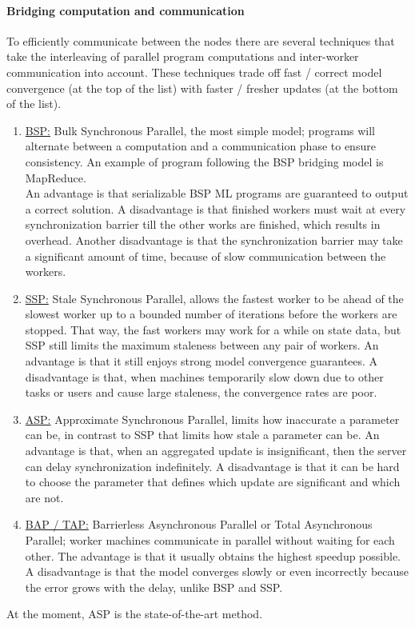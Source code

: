 \paragraph{Bridging computation and communication}
To efficiently communicate between the nodes there are several techniques that take the interleaving of parallel program computations and inter-worker communication into account. These techniques trade off fast / correct model convergence (at the top of the list) with faster / fresher updates (at the bottom of the list).
\begin{enumerate}
	\item \underline{BSP:} Bulk Synchronous Parallel, the most simple model; programs will alternate between a computation and a communication phase to ensure consistency\cite{Xing16}. An example of program following the BSP bridging model is MapReduce.\\
	An advantage is that serializable BSP ML programs are guaranteed to output a correct solution. A disadvantage is that finished workers must wait at every synchronization barrier till the other works are finished, which results in overhead\cite{Chilimbi14}. Another disadvantage is that the synchronization barrier may take a significant amount of time, because of slow communication between the workers.
	\item \underline{SSP:} Stale Synchronous Parallel, allows the fastest worker to be ahead of the slowest worker up to a bounded number of iterations before the workers are stopped. That way, the fast workers may work for a while on state data, but SSP still limits the maximum staleness between any pair of workers. An advantage is that it still enjoys strong model convergence guarantees. A disadvantage is that, when machines temporarily slow down due to other tasks or users and cause large staleness, the convergence rates are poor.
	\item \underline{ASP:} Approximate Synchronous Parallel, limits how inaccurate a parameter can be, in contrast to SSP that limits how stale a parameter can be. An advantage is that, when an aggregated update is insignificant, then the server can delay synchronization indefinitely. A disadvantage is that it can be hard to choose the parameter that defines which update are significant and which are not. \cite{Hsieh17}
	\item \underline{BAP / TAP:} Barrierless Asynchronous Parallel\cite{Han15} or Total Asynchronous Parallel\cite{Hsieh17}; worker machines communicate in parallel without waiting for each other. The advantage is that it usually obtains the highest speedup possible. A disadvantage is that the model converges slowly or even incorrectly because the error grows with the delay, unlike BSP and SSP. \cite{Han15}
\end{enumerate}
At the moment, ASP is the state-of-the-art method.



